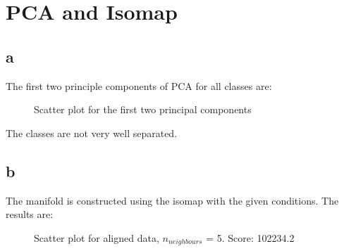 \documentclass[a4paper,12pt]{article}
\begin{document}

\tableofcontents %
\newpage

\section{PCA and Isomap}
\subsection{a}
The first two principle components of PCA for all classes are:
\begin{figure}[H]
\hfill
{}
\hfill
\caption{Scatter plot for the first two principal components}
\label{fig:a}
\label{41}
\end{figure}

The classes are not very well separated. 

\subsection{b}
The manifold is constructed using the isomap with the given conditions. The results are: 
\begin{figure}[H]
\hfill
{}
\hfill
\caption{Scatter plot for aligned data, $n_{neighbours}$ = 5. Score: 102234.2}
\label{51}
\end{figure}
\end{document}
